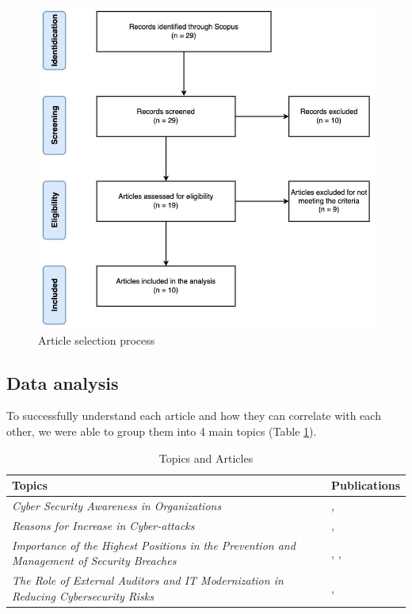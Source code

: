\documentclass[journal]{IEEEtran}
\begin{document}
\begin{figure}[!h]
    \centering
    \caption{Article selection process}
    \label{articles}
    \includegraphics[width=\linewidth]{images/articles.jpg}
\end{figure}


\subsection{Data analysis}

To successfully understand each article and how they can correlate with each other, we were able to group them into 4 main topics (Table \ref{table_1}).

\begin{table}[h!]
    \renewcommand{\arraystretch}{1.3}
    \normalsize
    \caption{Topics and Articles}
    \label{table_1}
    \centering
    
    \begin{tabular}{ m{18em} m{5em} }
        \hline
        \textbf{Topics} & \textbf{Publications} \\
        \hline
        \textit{Cyber Security Awareness in Organizations} & \cite{Steps_article1}, \cite{Edu_article1} \\
        \hline
        \textit{Reasons for Increase in Cyber-attacks}   & \cite{Edu_article4}\cite{sobral_1}, \cite{sobral_2} \\
        \hline
        \textit{Importance of the Highest Positions in the Prevention and Management of Security Breaches} & \cite{Steps_article3}, \cite{article3}, \cite{article11} \\
        \hline
        \textit{The Role of External Auditors and IT Modernization in Reducing Cybersecurity Risks} & \cite{bastos_1}, \cite{bastos_2} \\
        \hline
    \end{tabular}
    
\end{table}
\end{document}
